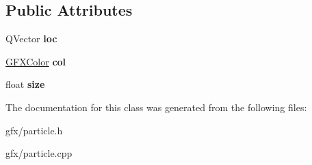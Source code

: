 \subsection*{Public Attributes}
\begin{DoxyCompactItemize}
\item 
Q\+Vector {\bfseries loc}\hypertarget{classParticlePoint_af6ead6e8b16b4d12133efcf6cfa01ca4}{}\label{classParticlePoint_af6ead6e8b16b4d12133efcf6cfa01ca4}

\item 
\hyperlink{structGFXColor}{G\+F\+X\+Color} {\bfseries col}\hypertarget{classParticlePoint_a5e899cd4c310e185b3d5305e5652309e}{}\label{classParticlePoint_a5e899cd4c310e185b3d5305e5652309e}

\item 
float {\bfseries size}\hypertarget{classParticlePoint_ab30a09b6b88b13394554c128f28de65b}{}\label{classParticlePoint_ab30a09b6b88b13394554c128f28de65b}

\end{DoxyCompactItemize}


The documentation for this class was generated from the following files\+:\begin{DoxyCompactItemize}
\item 
gfx/particle.\+h\item 
gfx/particle.\+cpp\end{DoxyCompactItemize}

